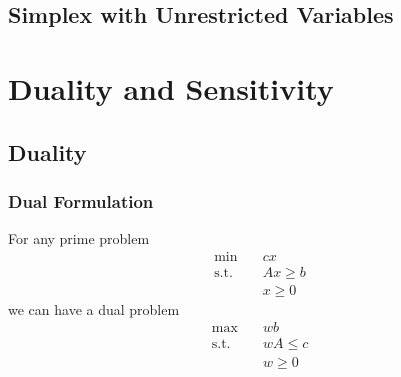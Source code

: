 			\section{Simplex with Unrestricted Variables}

		\chapter{Duality and Sensitivity}
			\section{Duality}
				\subsection{Dual Formulation}
					For any prime problem
					\begin{align}
						\min \quad & cx \\
						\text{s.t.} \quad & Ax\ge b \\
									& x\ge 0 
					\end{align}
					we can have a dual problem
					\begin{align}
						\max \quad & wb  \\
						\text{s.t.} \quad & wA\le c\\
									& w \ge 0
					\end{align}


